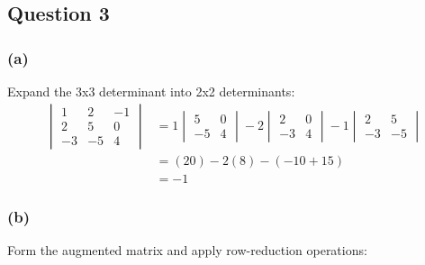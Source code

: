 \documentclass{article}
\begin{document}
\subsection*{Question 3}

\subsubsection*{(a)}

Expand the 3x3 determinant into 2x2 determinants:
\begin{align*}
 \begin{vmatrix}
  1 &  2 & -1 \\
  2 &  5 &  0 \\
 -3 & -5 &  4
 \end{vmatrix} &=
 1 \begin{vmatrix} 5 & 0 \\ -5 & 4 \end{vmatrix}
 -2 \begin{vmatrix} 2 & 0 \\ -3 & 4 \end{vmatrix}
 -1 \begin{vmatrix} 2 & 5 \\ -3 & -5 \end{vmatrix} \\
 &= (20) -2 (8) -(-10 + 15) \\
 &= -1
\end{align*}

\subsubsection*{(b)}

Form the augmented matrix and apply row-reduction operations:
\end{document}
